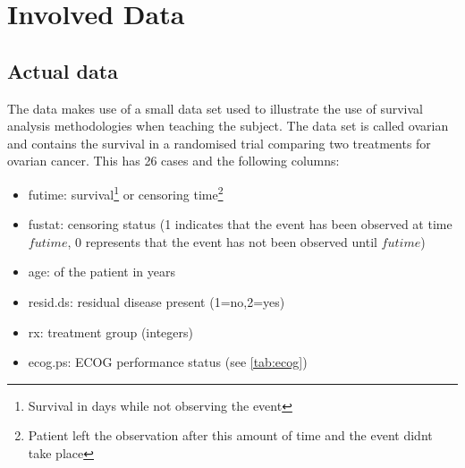 {\color{gray}
\section{Involved Data}
\subsection{Actual data}
The data makes use of a small data set used to illustrate the use of survival analysis methodologies when teaching the subject. The data set is called ovarian and contains the survival in a randomised trial comparing two treatments for ovarian cancer. This has 26 cases and the following columns:
\begin{itemize}

\item futime: survival\footnote{Survival in days while not observing the event} or censoring time\footnote{Patient left the observation after this amount of time and the event didnt take place}
\item fustat: censoring status (1 indicates that the event has been observed at time $futime$, 0 represents that the event has not been observed until $futime$)
\item age: of the patient in years
\item resid.ds: residual disease present (1=no,2=yes) 
\item rx: treatment group (integers)
\item ecog.ps: ECOG performance status (see \autoref{tab:ecog})
\end{itemize}

}

